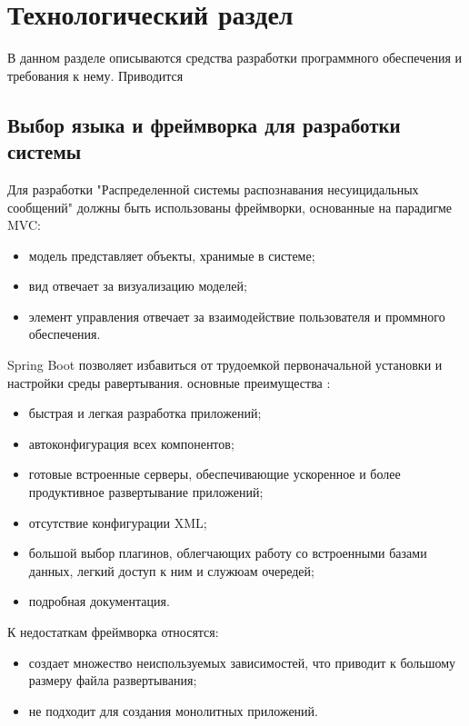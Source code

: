 \section{Технологический раздел}

В данном разделе описываются средства разработки программного обеспечения и требования к нему. Приводится 

\subsection{Выбор языка и фреймворка для разработки системы}

Для разработки "Распределенной системы распознавания несуицидальных сообщений" должны быть использованы фреймворки, основанные на парадигме MVC:
\begin{itemize}
\item модель представляет объекты, хранимые в системе;
\item вид отвечает за визуализацию моделей;
\item элемент управления отвечает за взаимодействие пользователя и проммного обеспечения.
\end{itemize}

Spring Boot позволяет избавиться от трудоемкой первоначальной установки и настройки среды равертывания. основные преимущества \cite{spring}:

\begin{itemize}
\item быстрая и легкая разработка приложений;
\item автоконфигурация всех компонентов;
\item готовые встроенные серверы, обеспечивающие ускоренное и более продуктивное развертывание приложений;
\item отсутствие конфигурации XML;
\item большой выбор плагинов, облегчающих работу со встроенными базами данных, легкий доступ к ним и служюам очередей;
\item подробная документация.
\end{itemize}

К недостаткам фреймворка относятся:
\begin{itemize}
\item создает множество неиспользуемых зависимостей, что приводит к большому размеру файла развертывания;
\item не подходит для создания монолитных приложений.
\end{itemize}

